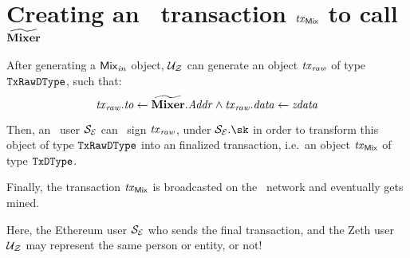 
\section{Creating an \ethereum~transaction $\mathit{\mathit{tx}_{\mathsf{Mix}}}$ to call $\widetilde{\mathbf{Mixer}}$}\label{zeth-protocol:create-tx}

After generating a $\mathit{{\mathsf{Mix}}_{in}}$ object, $\mathcal{{U}_{Z}}$ can generate an object $\mathit{\mathit{tx}_{raw}}$ of type ${\mathtt{TxRawDType}}$, such that:
\[
    \mathit{\mathit{tx}_{raw}}.\mathit{to} \gets \widetilde{\mathbf{Mixer}}.\mathit{Addr} \land \mathit{\mathit{tx}_{raw}}.\mathit{data} \gets \mathit{zdata}
\]

Then, an \ethereum~user $\mathcal{{S}_{E}}$ can \ecdsa~sign $\mathit{\mathit{tx}_{raw}}$, under $\eparty{S}.\sk$ in order to transform this object of type ${\mathtt{TxRawDType}}$ into an finalized transaction, i.e.~an object $\mathit{\mathit{tx}_{\mathsf{Mix}}}$ of type ${\mathtt{TxDType}}$.

Finally, the transaction $\mathit{\mathit{tx}_{\mathsf{Mix}}}$ is broadcasted on the \ethereum~network and eventually gets mined.

\begin{notebox}
    Here, the Ethereum user $\mathcal{{S}_{E}}$ who sends the final transaction, and the Zeth user $\mathcal{{U}_{Z}}$ may represent the same person or entity, or not!
\end{notebox}
